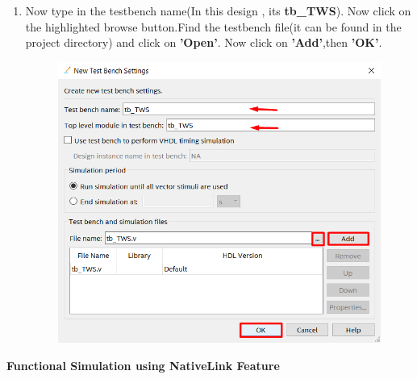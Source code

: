 \documentclass[12pt]{article}
\begin{document}
\begin{enumerate}
    \item Now type in the testbench name(In this design , its \textbf{tb\_TWS}). Now click on the highlighted browse button.Find the testbench file(it can be found in the project directory) and click on \textbf{'Open'}. Now click on \textbf{'Add'},then \textbf{'OK'}.
            \begin{figure}[H]
        \centering
    \includegraphics[scale=0.73]{tws7.png}
    \end{figure}
    
 \end{enumerate}
 \newpage
 \noindent \textbf{Functional Simulation using NativeLink Feature}
\end{document}
